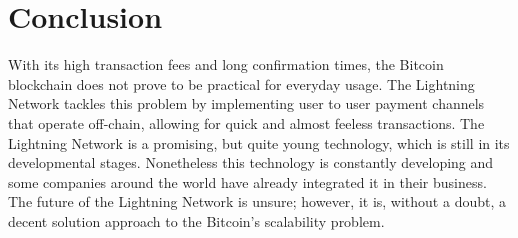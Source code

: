 \documentclass[a4paper, 12pt]{report}
\begin{document}
\chapter{Conclusion}

\par With its high transaction fees and long confirmation times, the Bitcoin blockchain does not prove to be practical for everyday usage. The Lightning Network tackles this problem by implementing user to user payment channels that operate off-chain, allowing for quick and almost feeless transactions. The Lightning Network is a promising, but quite young technology, which is still in its developmental stages. Nonetheless this technology is constantly developing and some companies around the world have already integrated it in their business. The future of the Lightning Network is unsure; however, it is, without a doubt, a decent solution approach to the Bitcoin’s scalability problem.

\printbibliography[
heading=bibintoc,
title={References}
]
\end{document}
